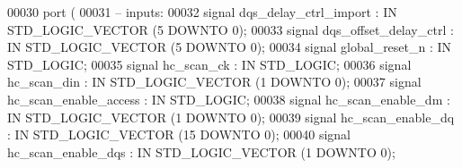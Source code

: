 \begin{DoxyCode}
00030         \textcolor{keywordflow}{port} \textcolor{vhdlchar}{(}
00031 \textcolor{keyword}{              -- inputs:}
00032                  \textcolor{keywordflow}{signal} \textcolor{vhdlchar}{dqs_delay_ctrl_import} \textcolor{vhdlchar}{:} \textcolor{keywordflow}{IN} \textcolor{comment}{STD\_LOGIC\_VECTOR} \textcolor{vhdlchar}{(}\textcolor{vhdllogic}{}\textcolor{vhdllogic}{5} \textcolor{keywordflow}{DOWNTO} \textcolor{vhdllogic}{}\textcolor{vhdllogic}{0}\textcolor{vhdlchar}{)};
00033                  \textcolor{keywordflow}{signal} \textcolor{vhdlchar}{dqs_offset_delay_ctrl} \textcolor{vhdlchar}{:} \textcolor{keywordflow}{IN} \textcolor{comment}{STD\_LOGIC\_VECTOR} \textcolor{vhdlchar}{(}\textcolor{vhdllogic}{}\textcolor{vhdllogic}{5} \textcolor{keywordflow}{DOWNTO} \textcolor{vhdllogic}{}\textcolor{vhdllogic}{0}\textcolor{vhdlchar}{)};
00034                  \textcolor{keywordflow}{signal} \textcolor{vhdlchar}{global_reset_n} \textcolor{vhdlchar}{:} \textcolor{keywordflow}{IN} \textcolor{comment}{STD\_LOGIC};
00035                  \textcolor{keywordflow}{signal} \textcolor{vhdlchar}{hc_scan_ck} \textcolor{vhdlchar}{:} \textcolor{keywordflow}{IN} \textcolor{comment}{STD\_LOGIC};
00036                  \textcolor{keywordflow}{signal} \textcolor{vhdlchar}{hc_scan_din} \textcolor{vhdlchar}{:} \textcolor{keywordflow}{IN} \textcolor{comment}{STD\_LOGIC\_VECTOR} \textcolor{vhdlchar}{(}\textcolor{vhdllogic}{}\textcolor{vhdllogic}{1} \textcolor{keywordflow}{DOWNTO} \textcolor{vhdllogic}{}\textcolor{vhdllogic}{0}\textcolor{vhdlchar}{)};
00037                  \textcolor{keywordflow}{signal} \textcolor{vhdlchar}{hc_scan_enable_access} \textcolor{vhdlchar}{:} \textcolor{keywordflow}{IN} \textcolor{comment}{STD\_LOGIC};
00038                  \textcolor{keywordflow}{signal} \textcolor{vhdlchar}{hc_scan_enable_dm} \textcolor{vhdlchar}{:} \textcolor{keywordflow}{IN} \textcolor{comment}{STD\_LOGIC\_VECTOR} \textcolor{vhdlchar}{(}\textcolor{vhdllogic}{}\textcolor{vhdllogic}{1} \textcolor{keywordflow}{DOWNTO} \textcolor{vhdllogic}{}\textcolor{vhdllogic}{0}\textcolor{vhdlchar}{)};
00039                  \textcolor{keywordflow}{signal} \textcolor{vhdlchar}{hc_scan_enable_dq} \textcolor{vhdlchar}{:} \textcolor{keywordflow}{IN} \textcolor{comment}{STD\_LOGIC\_VECTOR} \textcolor{vhdlchar}{(}\textcolor{vhdllogic}{}\textcolor{vhdllogic}{15} \textcolor{keywordflow}{DOWNTO} \textcolor{vhdllogic}{}\textcolor{vhdllogic}{0}\textcolor{vhdlchar}{)};
00040                  \textcolor{keywordflow}{signal} \textcolor{vhdlchar}{hc_scan_enable_dqs} \textcolor{vhdlchar}{:} \textcolor{keywordflow}{IN} \textcolor{comment}{STD\_LOGIC\_VECTOR} \textcolor{vhdlchar}{(}\textcolor{vhdllogic}{}\textcolor{vhdllogic}{1} \textcolor{keywordflow}{DOWNTO} \textcolor{vhdllogic}{}\textcolor{vhdllogic}{0}\textcolor{vhdlchar}{)};

\end{DoxyCode}
